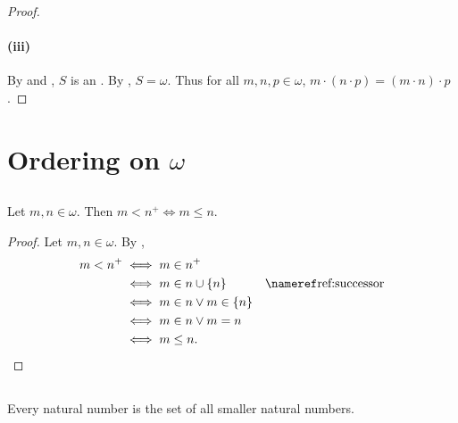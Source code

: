 \documentclass{report}
\begin{document}
\begin{proof}
    \paragraph{(iii)}%

      By  and , $S$
        is an .
      By , $S = \omega$.
      Thus for all $m, n, p \in \omega$,
        $m \cdot (n \cdot p) = (m \cdot n) \cdot p$.

  \end{proof}

\section{Ordering on \texorpdfstring{$\omega$}{Natural Numbers}}%

\subsection{}%

  \begin{lemma}
    Let $m, n \in \omega$.
    Then $m < n^+ \iff m \leq n$.
  \end{lemma}


  \begin{proof}
    Let $m, n \in \omega$.
    By ,
      \begin{align*}
        m < n^+
          & \iff m \in n^+ \\
          & \iff m \in n \cup \{n\} & \textref{ref:successor} \\
          & \iff m \in n \lor m \in \{n\} \\
          & \iff m \in n \lor m = n \\
          & \iff m \leq n.
      \end{align*}
  \end{proof}

\subsection{}%

  \begin{lemma}
    Every natural number is the set of all smaller natural numbers.
  \end{lemma}
\end{document}
